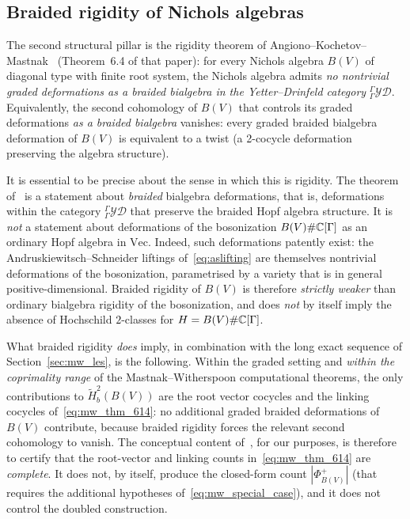 \subsection{Braided rigidity of Nichols algebras}
\label{sec:akm_rigidity}

The second structural pillar is the rigidity theorem of Angiono--Kochetov--Mastnak~\cite{AKM15} (Theorem~6.4 of that paper): for every Nichols algebra $B(V)$ of diagonal type with finite root system, the Nichols algebra admits \emph{no nontrivial graded deformations as a braided bialgebra in the Yetter--Drinfeld category} ${}^{\Gamma}_{\Gamma}\mathcal{YD}$. Equivalently, the second cohomology of $B(V)$ that controls its graded deformations \emph{as a braided bialgebra} vanishes: every graded braided bialgebra deformation of $B(V)$ is equivalent to a twist (a 2-cocycle deformation preserving the algebra structure).

It is essential to be precise about the sense in which this is rigidity. The theorem of~\cite{AKM15} is a statement about \emph{braided} bialgebra deformations, that is, deformations within the category ${}^{\Gamma}_{\Gamma}\mathcal{YD}$ that preserve the braided Hopf algebra structure. It is \emph{not} a statement about deformations of the bosonization $B(V) \# \mathbb{C}[\Gamma]$ as an ordinary Hopf algebra in $\mathrm{Vec}$. Indeed, such deformations patently exist: the Andruskiewitsch--Schneider liftings of~\eqref{eq:aslifting} are themselves nontrivial deformations of the bosonization, parametrised by a variety that is in general positive-dimensional. Braided rigidity of $B(V)$ is therefore \emph{strictly weaker} than ordinary bialgebra rigidity of the bosonization, and does \emph{not} by itself imply the absence of Hochschild $2$-classes for $H = B(V) \# \mathbb{C}[\Gamma]$.

What braided rigidity \emph{does} imply, in combination with the long exact sequence of Section~\ref{sec:mw_les}, is the following. Within the graded setting and \emph{within the coprimality range} of the Mastnak--Witherspoon computational theorems, the only contributions to $\tilde{H}^2_b(B(V))$ are the root vector cocycles and the linking cocycles of~\eqref{eq:mw_thm_614}: no additional graded braided deformations of $B(V)$ contribute, because braided rigidity forces the relevant second cohomology to vanish. The conceptual content of~\cite{AKM15}, for our purposes, is therefore to certify that the root-vector and linking counts in~\eqref{eq:mw_thm_614} are \emph{complete}. It does not, by itself, produce the closed-form count $|\Phi^+_{B(V)}|$ (that requires the additional hypotheses of~\eqref{eq:mw_special_case}), and it does not control the doubled construction.

